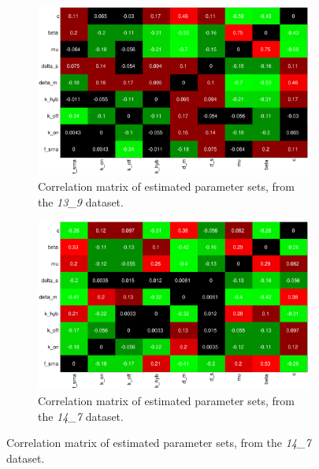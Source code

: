 \documentclass[10pt,journal]{./IEEE_latex_class/IEEEtran}
\begin{document}
\begin{figure}
        \begin{subfigure}[c]{0.49\textwidth}
        \centering
    \includegraphics[scale = 0.25, clip = true, trim = 100 0 100 0]{13_9_heatmap.eps}
        \caption{Correlation matrix of estimated parameter sets, from the  \textit{13\_9} dataset. }
    \end{subfigure}
    \begin{subfigure}[c]{0.49\textwidth}
    \centering
        \includegraphics[scale = 0.25, clip = true, trim = 80 0 80 0]{14_7_heatmap.eps}
        \caption{Correlation matrix of estimated parameter sets, from the  \textit{14\_7} dataset.}
    \end{subfigure}
    

\end{figure}
\end{document}
